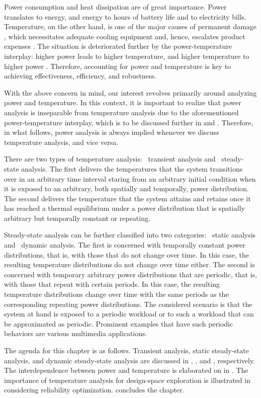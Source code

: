 Power consumption and heat dissipation are of great importance. Power translates
to energy, and energy to hours of battery life and to electricity bills.
Temperature, on the other hand, is one of the major causes of permanent damage
\cite{jedec2016}, which necessitates adequate cooling equipment and, hence,
escalates product expenses \cite{chaudhry2015}. The situation is deteriorated
further by the power-temperature interplay: higher power leads to higher
temperature, and higher temperature to higher power \cite{liu2007}. Therefore,
accounting for power and temperature is key to achieving effectiveness,
efficiency, and robustness.

With the above concern in mind, our interest revolves primarily around analyzing
power and temperature. In this context, it is important to realize that power
analysis is inseparable from temperature analysis due to the aforementioned
power-temperature interplay, which is to be discussed further in
 and . Therefore, in what
follows, power analysis is always implied whenever we discuss temperature
analysis, and vice versa.

There are two types of temperature analysis: \one~transient analysis and
\two~steady-state analysis. The first delivers the temperatures that the system
transitions over in an arbitrary time interval staring from an arbitrary initial
condition when it is exposed to an arbitrary, both spatially and temporally,
power distribution. The second delivers the temperature that the system attains
and retains once it has reached a thermal equilibrium under a power distribution
that is spatially arbitrary but temporally constant or repeating.

Steady-state analysis can be further classified into two categories: \one~static
analysis and \two~dynamic analysis. The first is concerned with temporally
constant power distributions, that is, with those that do not change over time.
In this case, the resulting temperature distributions do not change over time
either. The second is concerned with temporary arbitrary power distributions
that are periodic, that is, with those that repeat with certain periods. In this
case, the resulting temperature distributions change over time with the same
periods as the corresponding repeating power distributions. The considered
scenario is that the system at hand is exposed to a periodic workload or to such
a workload that can be approximated as periodic. Prominent examples that have
such periodic behaviors are various multimedia applications.

The agenda for this chapter is as follows. Transient analysis, static
steady-state analysis, and dynamic steady-state analysis are discussed in
, , and
, respectively. The interdependence between
power and temperature is elaborated on in .
The importance of temperature analysis for design-space exploration is
illustrated in  considering reliability
optimization.  concludes the chapter.
